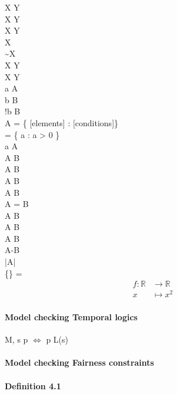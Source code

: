 X \implies Y  \\
X \impliedby Y \\
X \iff Y \\
\neg X \\
\sim X \\
X \land Y \\
X \lor Y \\
\forall a \in A \\
\exists b \in B \\
\exists !b \in B \\


A = \{ [elements] : [conditions]\} \\

 = \{ a \in {} : a > 0 \} \\

a \in A \\
A \subseteq B \\
A \subset B  \\
A \supseteq B \\
A \supset B  \\
A = B  \\
A \cong B \\
A \cup B \\
A \cap B \\
A-B \\
|A| \\
\{\} = \varnothing \\


\begin{align*}
	f \colon \mathbb{R} &\to \mathbb{R} \\
	x &\mapsto x^2
\end{align*}

 
\usepackage{tikz}
\usetikzlibrary{cd}

\usepackage{mathtools,halloweenmath}

\paragraph{Model checking Temporal logics}
M, s \models p $\Leftrightarrow$ p \in L(s)

\paragraph{Model checking Fairness constraints}
\paragraph{Definition 4.1}

